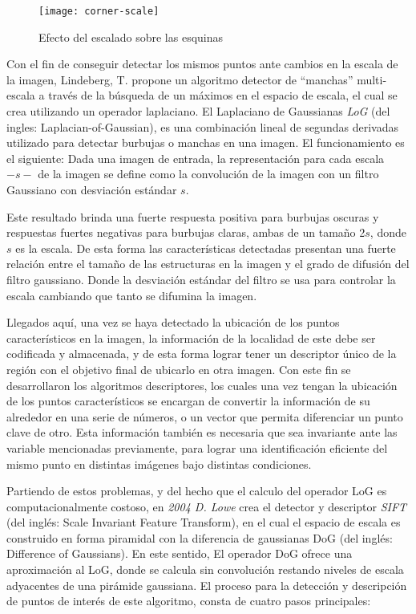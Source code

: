 \begin{figure}[H]
	\centering
	\texttt{[image: corner-scale]}
	\caption[Efecto del escalado sobre las esquinas]{Efecto del escalado sobre las esquinas	\protect\footnotemark}
	\label{imagen:corner-scale}
\end{figure}

Con el fin de conseguir detectar los mismos puntos ante cambios en la escala de la imagen, Lindeberg, T. \cite{log} propone un algoritmo detector de ``manchas'' multi-escala a través de la búsqueda de un máximos en el espacio de escala, el cual se crea utilizando un operador laplaciano. El Laplaciano de Gaussianas \textit{LoG} (del ingles: Laplacian-of-Gaussian), es una combinación lineal de segundas derivadas utilizado para detectar burbujas o manchas en una imagen. El funcionamiento es el siguiente: Dada una imagen de entrada, la representación para cada escala $-s-$ de la imagen se define como la convolución de la imagen con un filtro Gaussiano con desviación estándar $s$.

Este resultado brinda una fuerte respuesta positiva para burbujas oscuras y respuestas fuertes negativas para burbujas claras, ambas de un tamaño 2$s$, donde $s$ es la escala. De esta forma las características detectadas presentan una fuerte relación entre el tamaño de las estructuras en la imagen y el grado de difusión del filtro gaussiano. Donde la desviación estándar del filtro se usa para controlar la escala cambiando que tanto se difumina la imagen.

Llegados aquí, una vez se haya detectado la ubicación de los puntos característicos en la imagen, la información de la localidad de este debe ser codificada y almacenada, y de esta forma lograr tener un descriptor único de la región con el objetivo final de ubicarlo en otra imagen. Con este fin se desarrollaron los algoritmos descriptores, los cuales una vez tengan la ubicación de los puntos característicos se encargan de convertir la información de su alrededor en una serie de números, o un vector que permita diferenciar un punto clave de otro. Esta información también es necesaria que sea invariante ante las variable mencionadas previamente, para lograr una identificación eficiente del mismo punto en distintas imágenes bajo distintas condiciones.

Partiendo de estos problemas, y del hecho que el calculo del operador LoG es computacionalmente costoso, en \textit{2004 D. Lowe} crea el detector y descriptor \textit{SIFT} \cite{sift} (del inglés: Scale Invariant Feature Transform), en el cual el espacio de escala es construido en forma piramidal con la diferencia de gaussianas DoG (del inglés: Difference of Gaussians). En este sentido, El operador DoG ofrece una aproximación al LoG, donde se calcula sin convolución restando niveles de escala adyacentes de una pirámide gaussiana. El proceso para la detección y descripción de puntos de interés de este algoritmo, consta de cuatro pasos principales:

